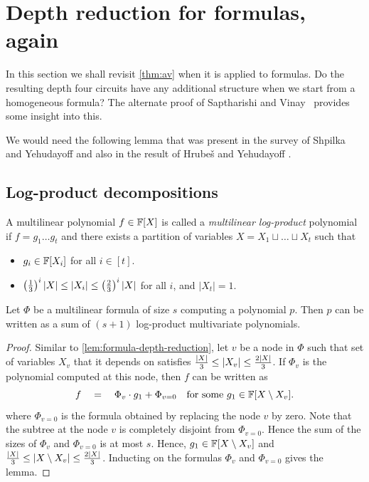 \section{Depth reduction for formulas, again}

In this section we shall revisit \autoref{thm:av} when it is applied to formulas.
Do the resulting depth four circuits have any additional structure when we start from a homogeneous formula?
The alternate proof of Saptharishi and Vinay~\cite{saptharishivinay14} provides some insight into this. 

We would need the following lemma that was present in the survey of Shpilka and Yehudayoff \cite{sy} and also in the result of Hrube\v{s} and Yehudayoff \cite{HY11a}.

\subsection{Log-product decompositions}

\begin{definition}\label{defn:mult-logproduct}
  A multilinear polynomial $f\in \mathbb{F}[X]$ is called a \emph{multilinear log-product} polynomial if $f = g_1\dots g_t$ and there exists a partition of variables $X = X_1 \sqcup \dots \sqcup X_t$ such that
  \begin{itemize}
  \item $g_i \in \mathbb{F}[X_i]$ for all $i \in [t]$.
  \item $\left(\frac{1}{3}\right)^i |X| \leq |X_i| \leq \left(\frac{2}{3}\right)^i |X|$ for all
    $i$, and $|X_t| = 1$.
  \end{itemize}
\end{definition}

\begin{lemma}\label{lem:mult-logproduct}
  Let $\Phi$ be a multilinear formula of size $s$ computing a polynomial $p$. 
Then $p$ can be written as a sum of $(s+1)$ log-product multivariate polynomials.
\end{lemma}
\begin{proof}
  Similar to \autoref{lem:formula-depth-reduction}, let $v$ be a node in $\Phi$ such that set of variables $X_v$ that it depends on satisfies $\frac{|X|}{3} \leq \left|X_v\right| \leq \frac{2|X|}{3}$. 
If $\Phi_v$ is the polynomial computed at this node, then $f$ can be written as
  $$
  f \quad = \quad \Phi_v \cdot g_1 + \Phi_{v=0} \quad\text{for some $g_1 \in \mathbb{F}[X\setminus X_v]$}.
  $$
  where $\Phi_{v=0}$ is the formula obtained by replacing the node $v$ by zero. 
Note that the subtree at the node $v$ is completely disjoint from $\Phi_{v=0}$. 
Hence the sum of the sizes of $\Phi_v$ and $\Phi_{v=0}$ is at most $s$. 
Hence, $g_1 \in \mathbb{F}[X\setminus X_v]$ and $\frac{|X|}{3} \leq \left|X \setminus X_v\right| \leq \frac{2|X|}{3}$. 
Inducting on the formulas $\Phi_v$ and $\Phi_{v=0}$ gives the lemma.
\end{proof}

